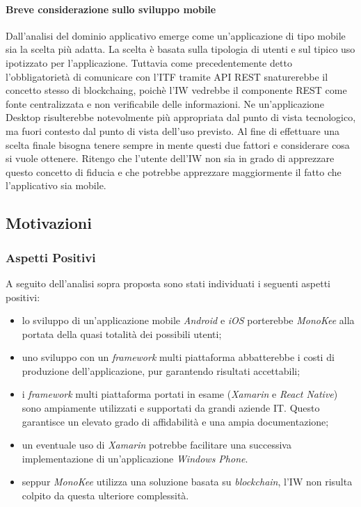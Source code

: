 \paragraph{Breve considerazione sullo sviluppo mobile}
Dall’analisi del dominio applicativo emerge come un’applicazione di tipo mobile sia la scelta più adatta. La scelta è basata sulla tipologia di utenti e sul tipico uso ipotizzato per l’applicazione. Tuttavia come precedentemente detto l’obbligatorietà di comunicare con l’ITF tramite API REST snaturerebbe il concetto stesso di \gls{blockchaing}, poichè l’IW vedrebbe il componente REST come fonte centralizzata e non verificabile delle informazioni. Ne un’applicazione Desktop risulterebbe notevolmente più appropriata dal punto di vista tecnologico, ma fuori contesto dal punto di vista dell’uso previsto.
Al fine di effettuare una scelta finale bisogna tenere sempre in mente questi due fattori e considerare cosa si vuole ottenere. Ritengo che l’utente dell’IW non sia in grado di apprezzare questo concetto di fiducia e che potrebbe apprezzare maggiormente il fatto che l’applicativo sia mobile.  
\subsection{Motivazioni}
\subsubsection{Aspetti Positivi}
A seguito dell’analisi sopra proposta sono stati individuati i seguenti aspetti positivi:
\begin{itemize} 
    \item lo sviluppo di un’applicazione mobile \emph{Android} e \emph{iOS} porterebbe \emph{MonoKee} alla portata della quasi totalità dei possibili utenti;
    \item uno sviluppo con un \emph{framework} multi piattaforma abbatterebbe i costi di produzione dell’applicazione, pur garantendo risultati accettabili;
    \item i \emph{framework} multi piattaforma portati in esame (\emph{Xamarin} e \emph{React Native}) sono ampiamente utilizzati e supportati da grandi aziende IT. Questo garantisce un elevato grado di affidabilità e una ampia documentazione;
    \item un eventuale uso di \emph{Xamarin} potrebbe facilitare una successiva implementazione di un’applicazione \emph{Windows Phone}.
    \item seppur \emph{MonoKee} utilizza una soluzione basata su \emph{blockchain}, l’IW non risulta colpito da questa ulteriore complessità.
\end{itemize}
